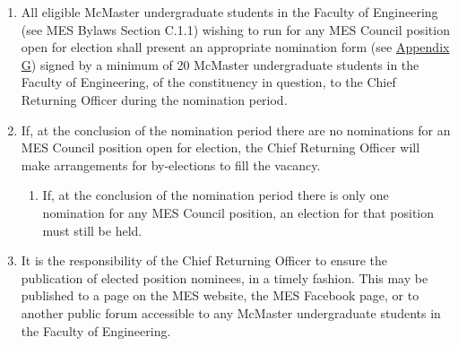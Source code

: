 \begin{enumerate}
 \item
  All eligible McMaster undergraduate students in the Faculty of
  Engineering (see MES Bylaws Section C.1.1) wishing to run for any MES
  Council position open for election shall present an appropriate
  nomination form (see
  \href{https://docs.google.com/document/d/1dRZfZ4WMP-EeRuchBlaPjHlO9ejTNlpU0btK_l7Uz2Y/edit\#heading=h.3nqndbk}{Appendix
   G}) signed by a minimum of 20 McMaster undergraduate students in the
  Faculty of Engineering, of the constituency in question, to the Chief
  Returning Officer during the nomination period.
 \item
  If, at the conclusion of the nomination period there are no
  nominations for an MES Council position open for election, the Chief
  Returning Officer will make arrangements for by-elections to fill the
  vacancy.

  \begin{enumerate}
   \item
    If, at the conclusion of the nomination period there is only one
    nomination for any MES Council position, an election for that
    position must still be held.
  \end{enumerate}
 \item
  It is the responsibility of the Chief Returning Officer to ensure the
  publication of elected position nominees, in a timely fashion. This
  may be published to a page on the MES website, the MES Facebook page,
  or to another public forum accessible to any McMaster undergraduate
  students in the Faculty of Engineering.

\end{enumerate}

